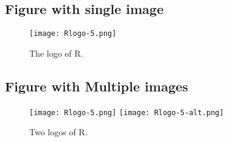 

\subsection{Figure with single image}

\begin{figure}[htbp]
    \centering
    \texttt{[image: Rlogo-5.png]}
    \caption{The logo of R.}
    \label{figure:rlogo}
\end{figure}

\subsection{Figure with Multiple images}

\begin{figure}[htbp]
    \centering
    \texttt{[image: Rlogo-5.png]}
    \texttt{[image: Rlogo-5-alt.png]}
    \caption{Two logos of R.}
    \label{figure:rlogo2}
\end{figure}



